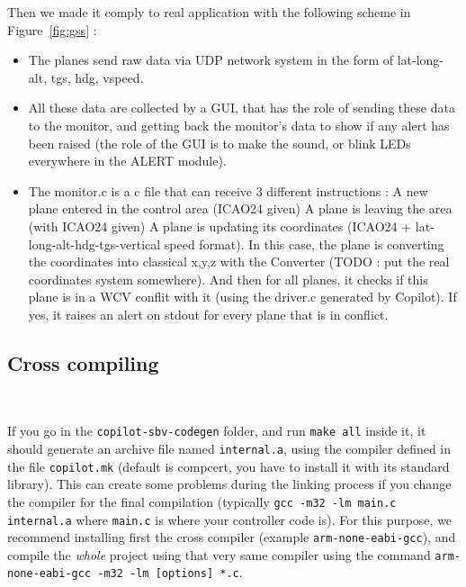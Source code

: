 Then we made it comply to real application with the following scheme in Figure~\ref{fig:gss} :
\begin{itemize}
	\item The planes send raw data via UDP network system in the form of lat-long-alt, tgs, hdg, vspeed.
	\item All these data are collected by a GUI, that has the role of sending these data to the monitor, and getting back the monitor's data to show if any alert has been raised (the role of the GUI is to make the sound, or blink LEDs everywhere in the ALERT module).
	\item The monitor.c is a c file that can receive 3 different instructions :
	\subitem A new plane entered in the control area (ICAO24 given)
	\subitem A plane is leaving the area (with ICAO24 given)
	\subitem A plane is updating its coordinates (ICAO24 + lat-long-alt-hdg-tgs-vertical speed format). In this case, the plane is converting the coordinates into classical x,y,z with the Converter (TODO : put the real coordinates system somewhere). And then for all planes, it checks if this plane is in a WCV conflit with it (using the driver.c generated by Copilot). If yes, it raises an alert on stdout for every plane that is in conflict. 
\end{itemize}

\subsection{Cross compiling}~\label{sec:cross}

If you go in the \texttt{copilot-sbv-codegen} folder, and run {\tt make all}
inside it, it should generate an archive file named \texttt{internal.a}, using
the compiler defined in the file \texttt{copilot.mk} (default is compcert, you
have to install it with its standard library). This can create some problems
during the linking process if you change the compiler for the final compilation
(typically \texttt{gcc -m32 -lm main.c internal.a} where \texttt{main.c} is
where your controller code is). For this purpose, we recommend installing first
the cross compiler (example \texttt{arm-none-eabi-gcc}), and compile the
\emph{whole} project using that very same compiler using the command \texttt{arm-none-eabi-gcc -m32 -lm [options] *.c}.
